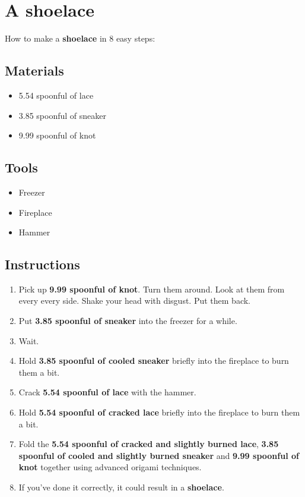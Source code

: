 \documentclass{article}
\begin{document}
\section{A shoelace}How to make a \textbf{shoelace} in 8 easy steps:

\subsection{Materials}\begin{itemize}
\item 
5.54 spoonful of lace
\item 
3.85 spoonful of sneaker
\item 
9.99 spoonful of knot
\end{itemize}
\subsection{Tools}\begin{itemize}
\item 
Freezer
\item 
Fireplace
\item 
Hammer
\end{itemize}
\subsection{Instructions}\begin{enumerate}
\item 
Pick up \textbf{9.99 spoonful of knot}. Turn them around. Look at them from every every side. Shake your head with disgust. Put them back.
\item 
Put \textbf{3.85 spoonful of sneaker} into the freezer for a while.
\item 
Wait.
\item 
Hold \textbf{3.85 spoonful of cooled sneaker} briefly into the fireplace to burn them a bit.
\item 
Crack \textbf{5.54 spoonful of lace} with the hammer.
\item 
Hold \textbf{5.54 spoonful of cracked lace} briefly into the fireplace to burn them a bit.
\item 
Fold the \textbf{5.54 spoonful of cracked and slightly burned lace}, \textbf{3.85 spoonful of cooled and slightly burned sneaker} and \textbf{9.99 spoonful of knot} together using advanced origami techniques.
\item 
If you've done it correctly, it could result in a \textbf{shoelace}.
\end{enumerate}
\newpage
\end{document}
